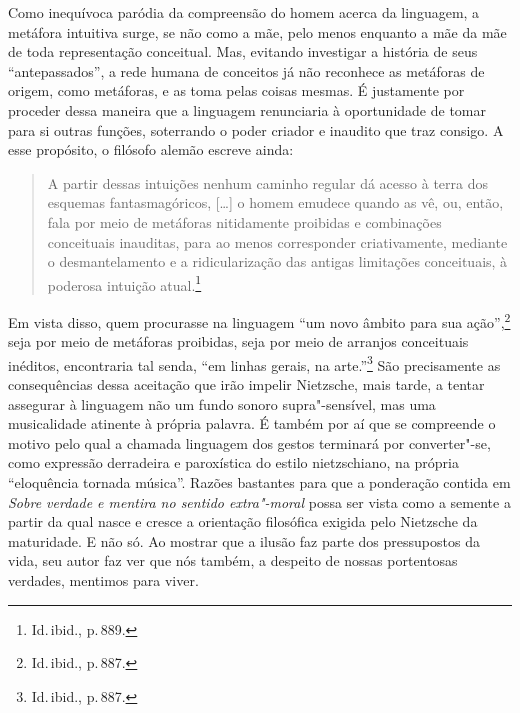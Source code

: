 Como inequívoca paródia da compreensão do homem acerca da linguagem, a
metáfora intuitiva surge, se não como a mãe, pelo menos enquanto a mãe
da mãe de toda representação conceitual. Mas, evitando investigar a
história de seus “antepassados”, a rede humana de conceitos já não
reconhece as metáforas de origem, como metáforas, e as toma pelas
coisas mesmas. É justamente por proceder dessa maneira que a linguagem
renunciaria à oportunidade de tomar para si outras funções, soterrando
o poder criador e inaudito que traz consigo. A esse propósito, o
filósofo alemão escreve ainda: 

\begin{quote}
A partir dessas intuições nenhum
caminho regular dá acesso à terra dos esquemas fantasmagóricos, [\ldots{}]
o homem emudece quando as vê, ou, então, fala por meio 
de metáforas nitidamente proibidas e combinações conceituais inauditas,
para ao menos corresponder criativamente, mediante o desmantelamento e
a ridicularização das antigas limitações conceituais, à poderosa
intuição atual.\footnote{ Id.\,ibid., p.\,889.}
\end{quote}

Em vista disso, quem procurasse na linguagem “um novo âmbito para sua
ação'',\footnote{ Id.\,ibid., p.\,887.} seja por meio de
metáforas proibidas, seja por meio de arranjos conceituais inéditos,
encontraria tal senda, ``em linhas gerais, na
arte.”\footnote{ Id.\,ibid., p.\,887.} São precisamente as consequências
dessa aceitação que irão impelir Nietzsche, mais tarde, a tentar assegurar
à linguagem não um fundo sonoro supra"-sensível, mas uma musicalidade
atinente à própria palavra. É também por aí que se compreende o motivo
pelo qual a chamada linguagem dos gestos terminará por converter"-se,
como expressão derradeira e paroxística do estilo nietzschiano, na
própria “eloquência tornada música”. Razões bastantes para que a
ponderação contida em \textit{Sobre verdade e mentira no sentido
extra"-moral } possa ser vista como a semente a partir da qual nasce e
cresce a orientação filosófica exigida pelo Nietzsche da maturidade. E
não só. Ao mostrar que a ilusão faz parte dos pressupostos da vida, seu
autor faz ver que nós também, a despeito de nossas portentosas
verdades, mentimos para viver.
